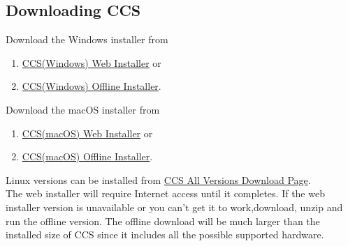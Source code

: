 \documentclass[a4paper,12pt,oneside]{book}
\begin{document}
\subsection{Downloading CCS}
Download the Windows installer from
\begin{enumerate}
\item \href{http://software-dl.ti.com/ccs/esd/CCSv7/CCS_7_1_0/exports/ccs_setup_7.1.0.00016.exe}{CCS(Windows) Web Installer} or
\item \href{http://software-dl.ti.com/ccs/esd/CCSv7/CCS_7_1_0/exports/CCS7.1.0.00016_win32.zip}{CCS(Windows) Offline Installer}. 
\end{enumerate} 
Download the macOS installer from
\begin{enumerate}
\item \href{http://software-dl.ti.com/ccs/esd/CCSv7/CCS_7_1_0/exports/CCS7.1.0.00016_web_osx.zip}{CCS(macOS) Web Installer} or
\item \href{http://software-dl.ti.com/ccs/esd/CCSv7/CCS_7_1_0/exports/CCS7.1.0.00016_osx.zip}{CCS(macOS) Offline Installer}. 
\end{enumerate} 
Linux versions can be installed from \href{http://processors.wiki.ti.com/index.php/Download_CCS}{CCS All Versions Download Page}. \\
\qquad The web installer will require Internet access until it completes. If the web installer version is unavailable or you can’t get it to work,download, unzip and run the offline version. The offline download will be much larger than the installed size of CCS since it includes all the possible supported hardware. 
\end{document}
